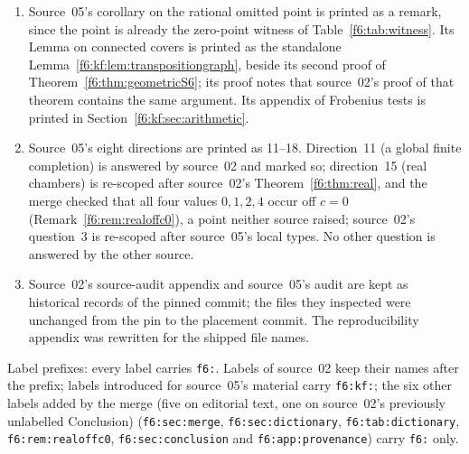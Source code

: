 \documentclass[11pt,a4paper]{article}
\theoremstyle{definition}
\newcommand{\code}[1]{\texttt{\nolinkurl{#1}}}
\begin{document}
\begin{enumerate}[label=\textup{(\arabic*)}]
($c$-adic factor), through the finite completion (nonproperness), and on a
different Morse line (geometric $S_6$). Source~05's arithmetic certificate
is a different target and is printed as its own theorem.
\item Source~05's corollary on the rational omitted point is printed as a
remark, since the point is already the zero-point witness of
Table~\ref{f6:tab:witness}. Its Lemma on connected covers is printed as the
standalone Lemma~\ref{f6:kf:lem:transpositiongraph}, beside its second proof
of Theorem~\ref{f6:thm:geometricS6}; its proof notes that source~02's proof
of that theorem contains the same argument. Its appendix of Frobenius tests is printed in
Section~\ref{f6:kf:sec:arithmetic}.
\item Source~05's eight directions are printed as 11--18. Direction~11 (a
global finite completion) is answered by source~02 and marked so;
direction~15 (real chambers) is re-scoped after source~02's
Theorem~\ref{f6:thm:real}, and the merge checked that all four values
$0,1,2,4$ occur off $c=0$ (Remark~\ref{f6:rem:realoffc0}), a point neither
source raised; source~02's question~3 is re-scoped after
source~05's local types. No other question is answered by the other source.
\item Source~02's source-audit appendix and source~05's audit are kept as
historical records of the pinned commit; the files they inspected were
unchanged from the pin to the placement commit. The reproducibility appendix was rewritten for the
shipped file names.
\end{enumerate}
Label prefixes: every label carries \code{f6:}. Labels of source~02 keep
their names after the prefix; labels introduced for source~05's material
carry \code{f6:kf:}; the six other labels added by the merge (five on editorial text, one on
source~02's previously unlabelled Conclusion)
(\code{f6:sec:merge}, \code{f6:sec:dictionary}, \code{f6:tab:dictionary},
\code{f6:rem:realoffc0}, \code{f6:sec:conclusion} and \code{f6:app:provenance})
carry \code{f6:} only.
\end{document}
